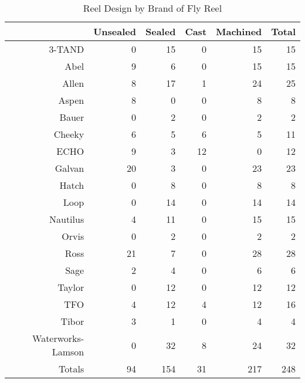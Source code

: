 \begin{table}[ht]
\centering
\begin{tabular}{rrrrrr}
  \hline
 & Unsealed & Sealed & Cast & Machined & Total \\ 
  \hline
3-TAND & 0 & 15 & 0 & 15 & 15 \\ 
  Abel & 9 & 6 & 0 & 15 & 15 \\ 
  Allen & 8 & 17 & 1 & 24 & 25 \\ 
  Aspen & 8 & 0 & 0 & 8 & 8 \\ 
  Bauer & 0 & 2 & 0 & 2 & 2 \\ 
  Cheeky & 6 & 5 & 6 & 5 & 11 \\ 
  ECHO & 9 & 3 & 12 & 0 & 12 \\ 
  Galvan & 20 & 3 & 0 & 23 & 23 \\ 
  Hatch & 0 & 8 & 0 & 8 & 8 \\ 
  Loop & 0 & 14 & 0 & 14 & 14 \\ 
  Nautilus & 4 & 11 & 0 & 15 & 15 \\ 
  Orvis & 0 & 2 & 0 & 2 & 2 \\ 
  Ross & 21 & 7 & 0 & 28 & 28 \\ 
  Sage & 2 & 4 & 0 & 6 & 6 \\ 
  Taylor & 0 & 12 & 0 & 12 & 12 \\ 
  TFO & 4 & 12 & 4 & 12 & 16 \\ 
  Tibor & 3 & 1 & 0 & 4 & 4 \\ 
  Waterworks-Lamson & 0 & 32 & 8 & 24 & 32 \\ 
  Totals & 94 & 154 & 31 & 217 & 248 \\ 
   \hline
\end{tabular}
\caption{Reel Design by Brand of Fly Reel} 
\label{tab:design_by_brand}
\end{table}
